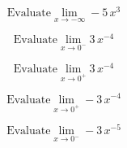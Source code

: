 \documentclass{ximera}
\begin{document}
\begin{question}

\[ \text{Evaluate} \lim_{x \to -\infty} -5 \, x^3 \]

\begin{multipleChoice}
\choice {$-\infty$}
\choice [correct]{$\infty$}
\end{multipleChoice}
\end{question}









\begin{question}

\[ \text{Evaluate} \lim_{x \to 0^-} 3 \, x^{-4} \]

\begin{multipleChoice}
\choice {$-\infty$}
\choice [correct]{$\infty$}
\end{multipleChoice}
\end{question}




\begin{question}

\[ \text{Evaluate} \lim_{x \to 0^+} 3 \, x^{-4} \]

\begin{multipleChoice}
\choice {$-\infty$}
\choice [correct]{$\infty$}
\end{multipleChoice}
\end{question}




\begin{question}

\[ \text{Evaluate} \lim_{x \to 0^+} -3 \, x^{-4} \]

\begin{multipleChoice}
\choice [correct]{$-\infty$}
\choice {$\infty$}
\end{multipleChoice}
\end{question}




\begin{question}

\[ \text{Evaluate} \lim_{x \to 0^-} -3 \, x^{-5} \]

\begin{multipleChoice}
\choice {$-\infty$}
\choice [correct]{$\infty$}
\end{multipleChoice}
\end{question}
\end{document}
